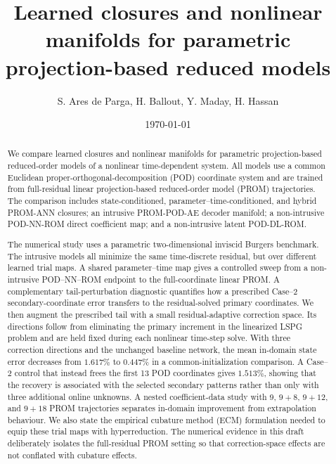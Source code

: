 \documentclass[11pt]{article}
\title{\vspace{-1.5em}Learned closures and nonlinear manifolds for parametric projection-based reduced models}
\author{S. Ares de Parga, H. Ballout, Y. Maday, H. Hassan}
\date{\today}
\begin{document}
\maketitle
\vspace{-1.0em}

\begin{abstract}
We compare learned closures and nonlinear manifolds for parametric
projection-based reduced-order models of a nonlinear time-dependent system.
All models use a common Euclidean proper-orthogonal-decomposition (POD)
coordinate system and are trained from full-residual linear
projection-based reduced-order model (PROM) trajectories.  The comparison
includes state-conditioned, parameter--time-conditioned, and hybrid
\textsc{PROM-ANN} closures; an intrusive \textsc{PROM-POD-AE} decoder
manifold; a non-intrusive \textsc{POD-NN-ROM} direct coefficient map; and a
non-intrusive latent \textsc{POD-DL-ROM}.

The numerical study uses a parametric two-dimensional inviscid Burgers
benchmark.  The intrusive models all minimize the same time-discrete residual,
but over different learned trial maps.  A shared parameter--time map gives a
controlled sweep from a non-intrusive POD--NN--ROM endpoint to the
full-coordinate linear PROM.  A complementary tail-perturbation diagnostic
quantifies how a prescribed Case--2 secondary-coordinate error transfers to
the residual-solved primary coordinates.  We then augment the prescribed
tail with a small residual-adaptive correction space.  Its directions follow
from eliminating the primary increment in the linearized LSPG problem and
are held fixed during each nonlinear time-step solve.  With three correction
directions and the unchanged baseline network, the mean in-domain state error
decreases from $1.617\%$ to $0.447\%$ in a common-initialization comparison.
A Case--2 control that instead frees the first 13 POD coordinates gives
$1.513\%$, showing that the recovery is associated with the selected
secondary patterns rather than only with three additional online unknowns.
A nested coefficient-data study
with 9, $9+8$, $9+12$, and $9+18$ PROM trajectories separates in-domain
    improvement from extrapolation behaviour.  We also state the empirical
    cubature method (ECM) formulation needed to equip these trial maps with
    hyperreduction.  The numerical evidence in this draft deliberately isolates
    the full-residual PROM setting so that correction-space effects are not
    conflated with cubature effects.
\end{abstract}
\end{document}
